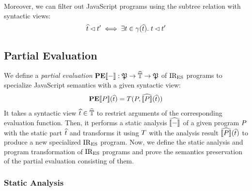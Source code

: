 Moreover, we can filter out JavaScript programs using the subtree relation with
syntactic views:
\[
  \widehat{t} \lhd t' \iff \exists t \in \gamma(\widehat{t}). \; t
  \lhd t'
\]



\subsection{Partial Evaluation}

We define a \textit{partial evaluation} $\textbf{PE}\llbracket{-}\rrbracket: \mathfrak{P} \rightarrow
\widehat{\mathbb{T}} \rightarrow \mathfrak{P}$ of $\text{IR}_\text{ES}$ programs to specialize JavaScript
semantics with a given syntactic view:
\[
  \textbf{PE}\llbracket{P}\rrbracket(\widehat{t}) = T(P, \widehat{\llbracket{P}\rrbracket}(\widehat{t}))
\]
It takes a syntactic view $\widehat{t} \in \widehat{\mathbb{T}}$ to restrict arguments of the
corresponding evaluation function. Then, it performs a static analysis
$\widehat{\llbracket{-}\rrbracket}$ of a given program $P$ with the static part $\widehat{t}$ and
transforms it using $T$ with the analysis result
$\widehat{\llbracket{P}\rrbracket}(\widehat{t})$ to produce a new specialized $\text{IR}_\text{ES}$ program.  Now, we
define the static analysis and program transformation of $\text{IR}_\text{ES}$ programs and
prove the semantics preservation of the partial evaluation consisting of them.

\subsubsection{Static Analysis}

